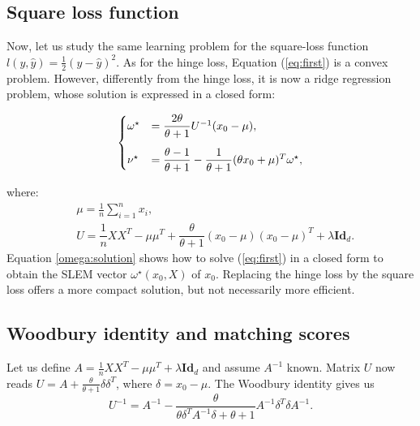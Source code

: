 \subsection{Square loss function}\label{SLEM}
Now, let us study the same learning problem for the square-loss function $l(y,\hat{y}) = \frac{1}{2}(y-\hat{y})^2$. As for the hinge loss, Equation (\ref{eq:first}) is a convex problem. 
However, differently from the hinge loss, it is now a ridge regression problem, whose solution is expressed in a closed form:

\begin{align}
\begin{cases}
\vspace{3 mm}
\omega^\star &= \dfrac{2\theta}{\theta+1}U^{-1}(x_0-\mu), \\
\nu^\star &= \dfrac{\theta-1}{\theta+1}-\dfrac{1}{\theta+1}(\theta x_0+\mu)^T\omega^\star,
\end{cases}
\label{omega:solution}
\end{align}

where:
\begin{align}
&\mu = \frac{1}{n}\sum_{i=1}^n x_i,\\
&U = \dfrac{1}{n}XX^T-\mu\mu^T+\dfrac{\theta}{\theta+1}(x_0-\mu)(x_0-\mu)^T+\lambda\textbf{Id}_d. \label{eq:U}
\end{align}
Equation \ref{omega:solution} shows how to solve (\ref{eq:first}) in a closed form to obtain the SLEM vector $\omega^\star(x_0,X)$ of $x_0$. 
Replacing the hinge loss by the square loss offers a more compact solution, but not necessarily more efficient.

\subsection{Woodbury identity and matching scores}
Let us define $A = \frac{1}{n}XX^T-\mu\mu^T +\lambda\textbf{Id}_d$ and assume $A^{-1}$ known. 
Matrix $U$ now reads $U = A + \frac{\theta}{\theta+1}\delta\delta^T$, where $\delta=x_0-\mu$. The Woodbury identity \cite{woodbury} gives us
\begin{equation}
U^{-1} = A^{-1} -\dfrac{\theta}{\theta\delta^TA^{-1}\delta+ \theta+1}A^{-1}\delta^T\delta A^{-1}. \label{invU}
\end{equation}

